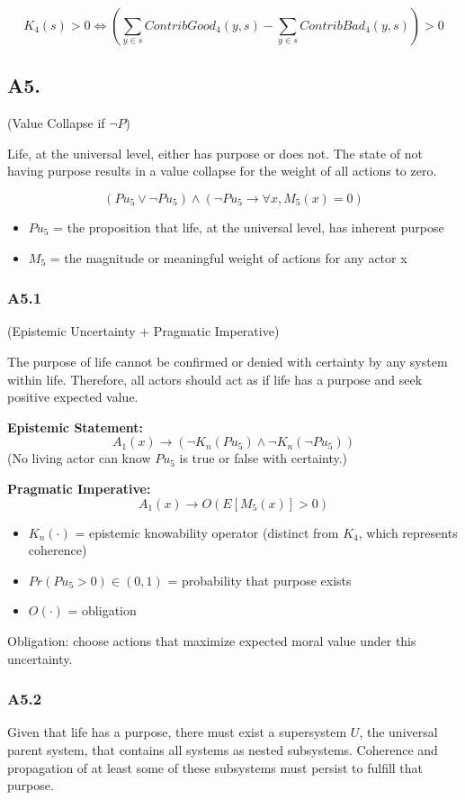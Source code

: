 \documentclass[11pt]{article}
\begin{document}
\[
K_4(s) > 0 \Leftrightarrow 
\left(\sum_{y \in s} ContribGood_4(y, s) - 
\sum_{y \in s} ContribBad_4(y, s)\right) > 0
\]

\subsection*{A5.}
(Value Collapse if $\neg P$)

Life, at the universal level, either has purpose or does not. The state of not having purpose results in a value collapse for the weight of all actions to zero.

\[
(Pu_5 \lor \neg Pu_5) \land (\neg Pu_5 \rightarrow \forall x, M_5(x) = 0)
\]
\begin{itemize}
\item $Pu_5$ = the proposition that life, at the universal level, has inherent purpose
\item $M_5$ = the magnitude or meaningful weight of actions for any actor x
\end{itemize}

\subsubsection*{A5.1}
(Epistemic Uncertainty + Pragmatic Imperative)

The purpose of life cannot be confirmed or denied with certainty by any system within life. Therefore, all actors should act as if life has a purpose and seek positive expected value.

\textbf{Epistemic Statement:}
\[
A_1(x) \rightarrow (\neg K_n(Pu_5) \land \neg K_n(\neg Pu_5))
\]
(No living actor can know $Pu_5$ is true or false with certainty.)

\textbf{Pragmatic Imperative:}
\[
A_1(x) \rightarrow O(E[M_5(x)] > 0)
\]

\begin{itemize}
\item $K_n(\cdot)$ = epistemic knowability operator (distinct from $K_4$, which represents coherence)
\item $Pr(Pu_5 > 0) \in (0, 1)$ = probability that purpose exists
\item $O(\cdot)$ = obligation
\end{itemize}
Obligation: choose actions that maximize expected moral value under this uncertainty.

\subsubsection*{A5.2}
Given that life has a purpose, there must exist a supersystem $U$, the universal parent system, that contains all systems as nested subsystems. Coherence and propagation of at least some of these subsystems must persist to fulfill that purpose.
\end{document}
